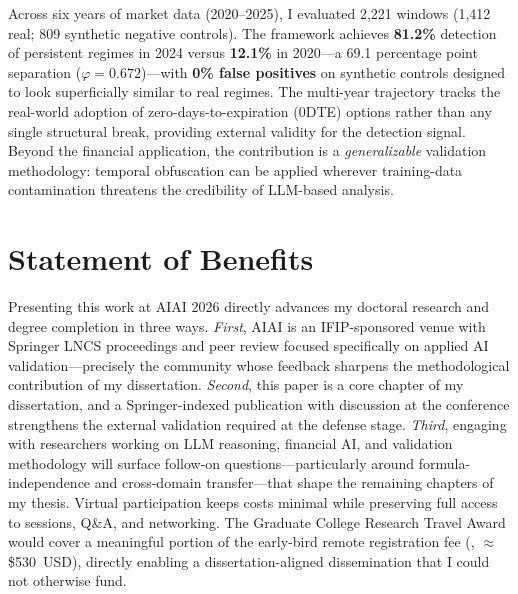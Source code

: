 \documentclass[11pt]{article}
\begin{document}
Across six years of market data (2020--2025), I evaluated 2,221 windows (1,412 real; 809 synthetic negative controls). The framework achieves \textbf{81.2\%} detection of persistent regimes in 2024 versus \textbf{12.1\%} in 2020---a 69.1 percentage point separation ($\varphi=0.672$)---with \textbf{0\% false positives} on synthetic controls designed to look superficially similar to real regimes. The multi-year trajectory tracks the real-world adoption of zero-days-to-expiration (0DTE) options rather than any single structural break, providing external validity for the detection signal. Beyond the financial application, the contribution is a \emph{generalizable} validation methodology: temporal obfuscation can be applied wherever training-data contamination threatens the credibility of LLM-based analysis.

\section*{Statement of Benefits}

Presenting this work at AIAI 2026 directly advances my doctoral research and degree completion in three ways. \emph{First}, AIAI is an IFIP-sponsored venue with Springer LNCS proceedings and peer review focused specifically on applied AI validation---precisely the community whose feedback sharpens the methodological contribution of my dissertation. \emph{Second}, this paper is a core chapter of my dissertation, and a Springer-indexed publication with discussion at the conference strengthens the external validation required at the defense stage. \emph{Third}, engaging with researchers working on LLM reasoning, financial AI, and validation methodology will surface follow-on questions---particularly around formula-independence and cross-domain transfer---that shape the remaining chapters of my thesis. Virtual participation keeps costs minimal while preserving full access to sessions, Q\&A, and networking. The Graduate College Research Travel Award would cover a meaningful portion of the early-bird remote registration fee (, $\approx$\$530~USD), directly enabling a dissertation-aligned dissemination that I could not otherwise fund.
\end{document}
